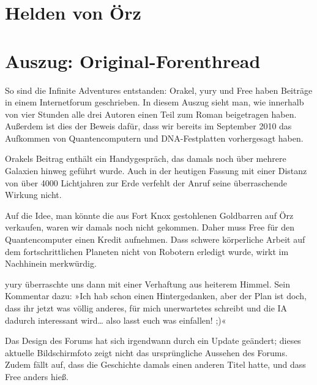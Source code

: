 \chapter{Helden von Örz}


\chapter{Auszug: Original-Forenthread}

So sind die Infinite Adventures entstanden: Orakel, yury und Free haben Beiträge in einem Internetforum geschrieben. In diesem Auszug sieht man, wie innerhalb von vier Stunden alle drei Autoren einen Teil zum Roman beigetragen haben. Außerdem ist dies der Beweis dafür, dass wir bereits im September 2010 das Aufkommen von Quantencomputern und DNA-Festplatten vorhergesagt haben.

Orakels Beitrag enthält ein Handygespräch, das damals noch über mehrere Galaxien hinweg geführt wurde. Auch in der heutigen Fassung mit einer Distanz von über 4000 Lichtjahren zur Erde verfehlt der Anruf seine überraschende Wirkung nicht.

Auf die Idee, man könnte die aus Fort Knox gestohlenen Goldbarren auf Örz verkaufen, waren wir damals noch nicht gekommen. Daher muss Free für den Quantencomputer einen Kredit aufnehmen. Dass schwere körperliche Arbeit auf dem fortschrittlichen Planeten nicht von Robotern erledigt wurde, wirkt im Nachhinein merkwürdig.

yury überraschte uns dann mit einer Verhaftung aus heiterem Himmel. Sein Kommentar dazu: »Ich hab schon einen Hintergedanken, aber der Plan ist doch, dass ihr jetzt was völlig anderes, für mich unerwartetes schreibt und die IA dadurch interessant wird… also lasst euch was einfallen! ;)«

Das Design des Forums hat sich irgendwann durch ein Update geändert; dieses aktuelle Bildschirmfoto zeigt nicht das ursprüngliche Aussehen des Forums. Zudem fällt auf, dass die Geschichte damals einen anderen Titel hatte, und dass Free anders hieß.

